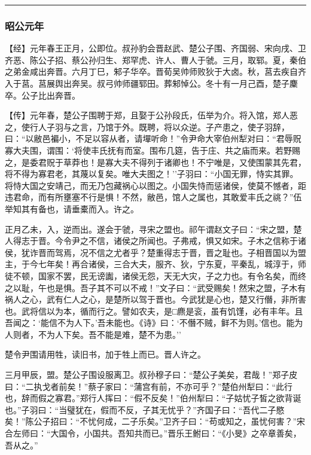 \documentclass[]{article}
\begin{document}
\begin{center}\rule{0.5\linewidth}{\linethickness}\end{center}

\hypertarget{header-n2354}{%
\subsubsection{昭公元年}\label{header-n2354}}

【经】元年春王正月，公即位。叔孙豹会晋赵武、楚公子围、齐国弱、宋向戌、卫齐恶、陈公子招、蔡公孙归生、郑罕虎、许人、曹人于虢。三月，取郓。夏，秦伯之弟金咸出奔晋。六月丁巳，邾子华卒。晋荀吴帅师败狄于大卤。秋，莒去疾自齐入于莒。莒展舆出奔吴。叔弓帅师疆郓田。葬邾悼公。冬十有一月己酉，楚子麇卒。公子比出奔晋。

【传】元年春，楚公子围聘于郑，且娶于公孙段氏，伍举为介。将入馆，郑人恶之，使行人子羽与之言，乃馆于外。既聘，将以众逆。子产患之，使子羽辞，曰：``以敝邑褊小，不足以容从者，请墠听命！''令尹命大宰伯州犁对曰：``君辱贶寡大夫围，谓围：`将使丰氏抚有而室。围布几筵，告于庄、共之庙而来。若野赐之，是委君贶于草莽也！是寡大夫不得列于诸卿也！不宁唯是，又使围蒙其先君，将不得为寡君老，其蔑以复矣。唯大夫图之！''子羽曰：``小国无罪，恃实其罪。将恃大国之安靖己，而无乃包藏祸心以图之。小国失恃而惩诸侯，使莫不憾者，距违君命，而有所壅塞不行是惧！不然，敝邑，馆人之属也，其敢爱丰氏之祧？''伍举知其有备也，请垂橐而入。许之。

正月乙未，入，逆而出。遂会于虢，寻宋之盟也。祁午谓赵文子曰：``宋之盟，楚人得志于晋。今令尹之不信，诸侯之所闻也。子弗戒，惧又如宋。子木之信称于诸侯，犹诈晋而驾焉，况不信之尤者乎？楚重得志于晋，晋之耻也。子相晋国以为盟主，于今七年矣！再合诸侯，三合大夫，服齐、狄，宁东夏，平秦乱，城淳于，师徒不顿，国家不罢，民无谤讟，诸侯无怨，天无大灾，子之力也。有令名矣，而终之以耻，午也是惧。吾子其不可以不戒！''文子曰：``武受赐矣！然宋之盟，子木有祸人之心，武有仁人之心，是楚所以驾于晋也。今武犹是心也，楚又行僭，非所害也。武将信以为本，循而行之。譬如农夫，是□麃是衮，虽有饥馑，必有丰年。且吾闻之：`能信不为人下。'吾未能也。《诗》曰：`不僭不贼，鲜不为则。'信也。能为人则者，不为人下矣。吾不能是难，楚不为患。''

楚令尹围请用牲，读旧书，加于牲上而已。晋人许之。

三月甲辰，盟。楚公子围设服离卫。叔孙穆子曰：``楚公子美矣，君哉！''郑子皮曰：``二执戈者前矣！''蔡子家曰：``蒲宫有前，不亦可乎？''楚伯州犁曰：``此行也，辞而假之寡君。''郑行人挥曰：``假不反矣！''伯州犁曰：``子姑忧子皙之欲背诞也。''子羽曰：``当璧犹在，假而不反，子其无忧乎？''齐国子曰：``吾代二子愍矣！''陈公子招曰：``不忧何成，二子乐矣。''卫齐子曰：``苟或知之，虽忧何害？''宋合左师曰：``大国令，小国共。吾知共而已。''晋乐王鲋曰：``《小旻》之卒章善矣，吾从之。''
\end{document}
